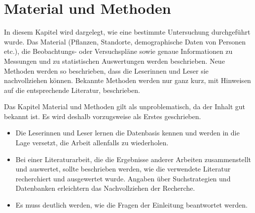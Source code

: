 \chapter{Material und Methoden}
\label{chap:realisation}


In diesem Kapitel wird dargelegt, wie eine bestimmte Untersuchung durchgeführt wurde. Das Material (Pflanzen, Standorte, demographische Daten von Personen etc.), die Beobachtungs- oder Versuchspläne sowie genaue Informationen zu Messungen und zu statistischen Auswertungen werden beschrieben. Neue Methoden werden so beschrieben, dass die Leserinnen und Leser sie nachvollziehen können. Bekannte Methoden werden nur ganz kurz, mit Hinweisen auf die entsprechende Literatur, beschrieben.

Das Kapitel Material und Methoden gilt als unproblematisch, da der Inhalt gut bekannt ist. Es
wird deshalb vorzugsweise als Erstes geschrieben.

\begin{itemize}
    \item Die Leserinnen und Leser lernen die Datenbasis kennen und werden in die Lage versetzt, die Arbeit allenfalls zu wiederholen.
    \item Bei einer Literaturarbeit, die die Ergebnisse anderer Arbeiten zusammenstellt und auswertet, sollte beschrieben werden, wie die verwendete Literatur recherchiert und ausgewertet wurde. Angaben über Suchstrategien und Datenbanken erleichtern das Nachvollziehen der Recherche.
    \item Es muss deutlich werden, wie die Fragen der Einleitung beantwortet werden.
\end{itemize}

